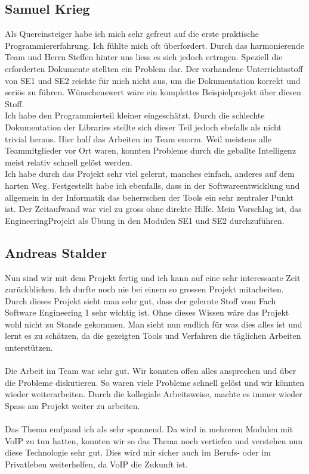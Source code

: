 \documentclass[a4,12pt]{scrartcl}
\begin{document}
\subsection{Samuel Krieg}
Als Quereinsteiger habe ich mich sehr gefreut auf die erste praktische Programmiererfahrung. Ich fühlte mich oft überfordert. Durch das harmonierende Team und Herrn Steffen hinter uns liess es sich jedoch ertragen. Speziell die erforderten Dokumente stellten ein Problem dar. Der vorhandene Unterrichtsstoff von SE1 und SE2 reichte für mich nicht aus, um die Dokumentation korrekt und seriös zu führen. Wünschenswert wäre ein komplettes Beispielprojekt über diesen Stoff. 
\\
Ich habe den Programmierteil kleiner eingeschätzt. Durch die schlechte Dokumentation der Libraries stellte sich dieser Teil jedoch ebefalls als nicht trivial heraus. Hier half das Arbeiten im Team enorm. Weil meistens alle Teammitglieder vor Ort waren, konnten Probleme durch die geballte Intelligenz meist relativ schnell gelöst werden. 
\\
Ich habe durch das Projekt sehr viel gelernt, manches einfach, anderes auf dem harten Weg. Festgestellt habe ich ebenfalls, dass in der Softwareentwicklung und allgemein in der Informatik das beherrschen der Tools ein sehr zentraler Punkt ist. Der Zeitaufwand war viel zu gross ohne direkte Hilfe. Mein Vorschlag ist, das EngineeringProjekt als Übung in den Modulen SE1 und SE2 durchzuführen.

\subsection{Andreas Stalder}
Nun sind wir mit dem Projekt fertig und ich kann auf eine sehr interessante Zeit zurückblicken. Ich durfte noch nie bei einem so grossen Projekt mitarbeiten. Durch dieses Projekt sieht man sehr gut, dass der gelernte Stoff vom Fach Software Engineering 1 sehr wichtig ist. Ohne dieses Wissen wäre das Projekt wohl nicht zu Stande gekommen. Man sieht nun endlich für was dies alles ist und lernt es zu schätzen, da die gezeigten Tools und Verfahren die täglichen Arbeiten unterstützen.\\
\\
Die Arbeit im Team war sehr gut. Wir konnten offen alles ansprechen und über die Probleme diskutieren. So waren viele Probleme schnell gelöst und wir könnten wieder weiterarbeiten. Durch die kollegiale Arbeitsweise, machte es immer wieder Spass am Projekt weiter zu arbeiten.\\
\\
Das Thema emfpand ich als sehr spannend. Da wird in mehreren Modulen mit VoIP zu tun hatten, konnten wir so das Thema noch vertiefen und verstehen nun diese Technologie sehr gut. Dies wird mir sicher auch im Berufs-  oder im Privatleben weiterhelfen, da VoIP die Zukunft ist. \\
\newpage
\end{document}
